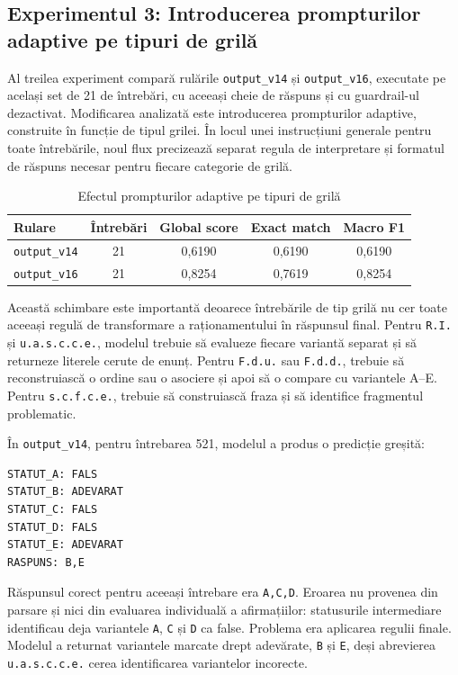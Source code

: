 \documentclass[12pt, a4paper, oneside, romanian]{teza-upb}
\begin{document}
\subsection{Experimentul 3: Introducerea prompturilor adaptive pe tipuri de grilă}

Al treilea experiment compară rulările \texttt{output\_v14} și \texttt{output\_v16}, executate pe același set de 21 de întrebări, cu aceeași cheie de răspuns și cu guardrail-ul dezactivat. Modificarea analizată este introducerea prompturilor adaptive, construite în funcție de tipul grilei. În locul unei instrucțiuni generale pentru toate întrebările, noul flux precizează separat regula de interpretare și formatul de răspuns necesar pentru fiecare categorie de grilă.

\begin{table}[H]
\centering
\caption{Efectul prompturilor adaptive pe tipuri de grilă}
\label{tab:experiment_model_v14_v16}
\small
\begin{tabular}{lcccc}
\toprule
\textbf{Rulare} & \textbf{Întrebări} & \textbf{Global score} & \textbf{Exact match} & \textbf{Macro F1} \\
\midrule
\texttt{output\_v14} & 21 & 0,6190 & 0,6190 & 0,6190 \\
\texttt{output\_v16} & 21 & 0,8254 & 0,7619 & 0,8254 \\
\bottomrule
\end{tabular}
\end{table}

Această schimbare este importantă deoarece întrebările de tip grilă nu cer toate aceeași regulă de transformare a raționamentului în răspunsul final. Pentru \texttt{R.I.} și \texttt{u.a.s.c.c.e.}, modelul trebuie să evalueze fiecare variantă separat și să returneze literele cerute de enunț. Pentru \texttt{F.d.u.} sau \texttt{F.d.d.}, trebuie să reconstruiască o ordine sau o asociere și apoi să o compare cu variantele A--E. Pentru \texttt{s.c.f.c.e.}, trebuie să construiască fraza și să identifice fragmentul problematic.


În \texttt{output\_v14}, pentru întrebarea 521, modelul a produs o predicție greșită:

\begin{lstlisting}[basicstyle=\ttfamily\footnotesize]
STATUT_A: FALS
STATUT_B: ADEVARAT
STATUT_C: FALS
STATUT_D: FALS
STATUT_E: ADEVARAT
RASPUNS: B,E
\end{lstlisting}

Răspunsul corect pentru aceeași întrebare era \texttt{A,C,D}. Eroarea nu provenea din parsare și nici din evaluarea individuală a afirmațiilor: statusurile intermediare identificau deja variantele \texttt{A}, \texttt{C} și \texttt{D} ca false. Problema era aplicarea regulii finale. Modelul a returnat variantele marcate drept adevărate, \texttt{B} și \texttt{E}, deși abrevierea \texttt{u.a.s.c.c.e.} cerea identificarea variantelor incorecte.
\end{document}
